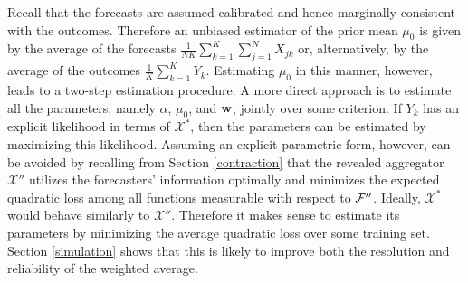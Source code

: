 \documentclass[12pt]{article}
\theoremstyle{definition}
\theoremstyle{definition}
\def\w{{\bf w}}
\def\F{{\cal F}}
\begin{document}
 
Recall that the forecasts are assumed calibrated and hence marginally consistent with the outcomes. Therefore an unbiased estimator of the prior mean $\mu_0$ is given by the average of the forecasts $\frac{1}{NK} \sum_{k=1}^K\sum_{j=1}^N X_{jk}$ or, alternatively, by the average of the outcomes $\frac{1}{K} \sum_{k=1}^K Y_k$. Estimating $\mu_0$ in this manner, however, leads to a two-step estimation procedure. A more direct approach is to estimate all the parameters, namely $\alpha$, $\mu_0$, and $\w$, jointly over some criterion. If $Y_k$ has an explicit likelihood in terms of $\mathcal{X}^*$, then the parameters can be estimated by maximizing this likelihood. Assuming an explicit parametric form, however, can be avoided by recalling from Section \ref{contraction} that the revealed aggregator $\mathcal{X}''$ utilizes the forecasters' information optimally and minimizes the expected quadratic loss among all functions measurable with respect to $\F''$. Ideally, $\mathcal{X}^*$ would behave similarly to $\mathcal{X}''$. Therefore it makes sense to estimate its parameters by minimizing the average quadratic loss over some training set. Section \ref{simulation} shows that this is likely to improve both the resolution and reliability of the weighted average. 
\end{document}
